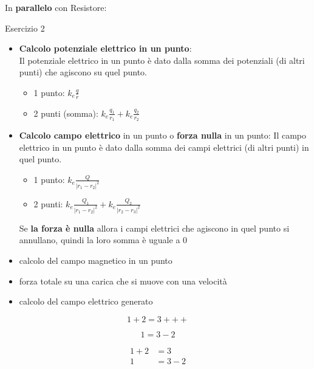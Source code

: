\documentclass{article}
\begin{document}
In \textbf{parallelo} con Resistore:

Esercizio 2
\begin{itemize}
\item \textbf{Calcolo potenziale elettrico in un punto}:
    \\Il potenziale elettrico in un punto è dato dalla somma dei potenziali (di altri punti) che agiscono su quel punto.
    \begin{itemize}
        \item 1 punto: $k_e\frac{q}{r}$
        \item 2 punti (somma): $k_e\frac{q_1}{r_1}+k_e\frac{q_2}{r_2}$
    \end{itemize}

\item \textbf{Calcolo campo elettrico} in un punto o \textbf{forza nulla} in un punto:
    Il campo elettrico in un punto è dato dalla somma dei campi elettrici (di altri punti) in quel punto.
    \begin{itemize}
        \item 1 punto: $k_e\frac{Q}{|r_1-r_2|^2}$
        \item 2 punti: $k_e\frac{Q_1}{|r_1-r_2|^2}+k_e\frac{Q_2}{|r_2-r_3|^2}$
    \end{itemize}
  
    Se \textbf{la forza è nulla} allora i campi elettrici che agiscono in quel punto si annullano, quindi la loro somma è uguale a $0$
\item calcolo del campo magnetico in un punto
\item forza totale su una carica che si muove con una velocità
\item calcolo del campo elettrico generato 

\end{itemize}

\begin{equation*}
  1 + 2 = 3 +++
\end{equation*}

\begin{equation*}
  1 = 3 - 2
\end{equation*}

\begin{align*}
  1 + 2 &= 3\\
  1 &= 3 - 2
\end{align*}
\end{document}
